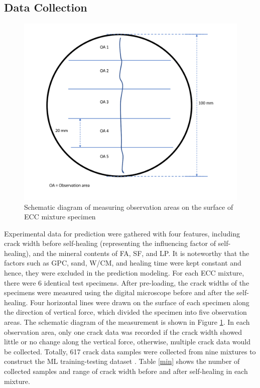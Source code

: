\documentclass[11pt]{article}
\begin{document}
	\subsection{Data Collection}
	\label{dc}
	
	\begin{figure}[!h]
		\centering
		\includegraphics[width=.75\textwidth]{measurement}
		\caption{Schematic diagram of measuring observation areas on the surface of ECC mixture specimen}
		\label{ma}
	\end{figure}
	
	
	Experimental data for prediction were gathered with four features, including crack width before self-healing (representing the influencing factor of self-healing), and the mineral contents of  FA, SF, and LP. It is noteworthy that the factors such as GPC, sand, W/CM, and healing time were kept  constant and hence, they were excluded in the prediction modeling. For each ECC mixture, there were 6 identical test specimens. After pre-loading, the crack widths of the specimens were measured using the digital microscope before and after the self-healing. Four horizontal lines were drawn on the surface of each specimen along the direction of vertical force, which divided the specimen into five observation areas. The schematic diagram of the measurement is shown in Figure \ref{ma}. In each observation area, only one crack data was recorded if the crack width showed little or no change along the vertical force, otherwise, multiple crack data would be collected. Totally, 617 crack data samples were collected from nine mixtures to construct the ML training-testing dataset \cite{chen2021selfhealing}. Table \ref{min} shows the number of collected samples and range of crack width before and after self-healing in each mixture. 
	
\end{document}
